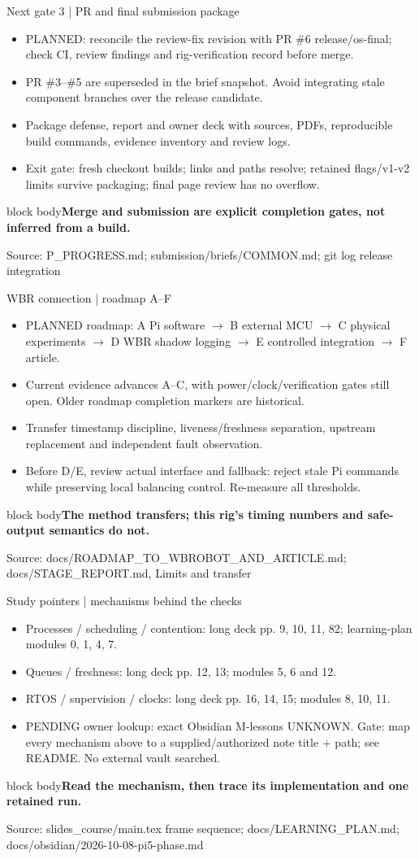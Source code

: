 \documentclass[aspectratio=169,12pt,t]{beamer}
\newcommand{\src}[1]{\par\vfill{\small\color{muted}Source: #1}}
\newcommand{\takeaway}[1]{\par\medskip\begin{beamercolorbox}[sep=2mm,wd=\linewidth]{block body}\color{navy}\textbf{#1}\end{beamercolorbox}}
\begin{document}
\begin{frame}{Next gate 3 | PR and final submission package}
\begin{itemize}
\item PLANNED: reconcile the review-fix revision with PR \#6 release/os-final; check CI, review findings and rig-verification record before merge.
\item PR \#3–\#5 are superseded in the brief snapshot. Avoid integrating stale component branches over the release candidate.
\item Package defense, report and owner deck with sources, PDFs, reproducible build commands, evidence inventory and review logs.
\item Exit gate: fresh checkout builds; links and paths resolve; retained flags/v1-v2 limits survive packaging; final page review has no overflow.
\end{itemize}
\takeaway{Merge and submission are explicit completion gates, not inferred from a build.}\src{P\_PROGRESS.md; submission/briefs/COMMON.md; git log release integration}
\end{frame}
\begin{frame}{WBR connection | roadmap A–F}
\begin{itemize}
\item PLANNED roadmap: A Pi software $\rightarrow$ B external MCU $\rightarrow$ C physical experiments $\rightarrow$ D WBR shadow logging $\rightarrow$ E controlled integration $\rightarrow$ F article.
\item Current evidence advances A–C, with power/clock/verification gates still open. Older roadmap completion markers are historical.
\item Transfer timestamp discipline, liveness/freshness separation, upstream replacement and independent fault observation.
\item Before D/E, review actual interface and fallback: reject stale Pi commands while preserving local balancing control. Re-measure all thresholds.
\end{itemize}
\takeaway{The method transfers; this rig’s timing numbers and safe-output semantics do not.}\src{docs/ROADMAP\_TO\_WBROBOT\_AND\_ARTICLE.md; docs/STAGE\_REPORT.md, Limits and transfer}
\end{frame}
\begin{frame}{Study pointers | mechanisms behind the checks}
\begin{itemize}
\item Processes / scheduling / contention: long deck pp. 9, 10, 11, 82; learning-plan modules 0, 1, 4, 7.
\item Queues / freshness: long deck pp. 12, 13; modules 5, 6 and 12.
\item RTOS / supervision / clocks: long deck pp. 16, 14, 15; modules 8, 10, 11.
\item PENDING owner lookup: exact Obsidian M-lessons UNKNOWN. Gate: map every mechanism above to a supplied/authorized note title + path; see README. No external vault searched.
\end{itemize}
\takeaway{Read the mechanism, then trace its implementation and one retained run.}\src{slides\_course/main.tex frame sequence; docs/LEARNING\_PLAN.md; docs/obsidian/2026-10-08-pi5-phase.md}
\end{frame}
\end{document}
